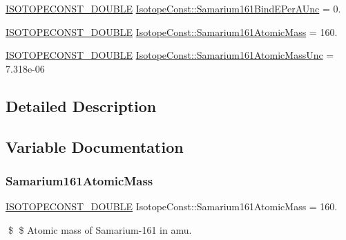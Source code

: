 \begin{DoxyCompactItemize}
\mbox{\hyperlink{group___isotope_const-_macros_ga8f45a7272ce02c0b4c65c44636ed719a}{I\+S\+O\+T\+O\+P\+E\+C\+O\+N\+S\+T\+\_\+\+D\+O\+U\+B\+LE}} \mbox{\hyperlink{group___isotope_const-_samarium-_sm161_gabdaadaf551b7c2b8d770944d9c60d25f}{Isotope\+Const\+::\+Samarium161\+Bind\+E\+Per\+A\+Unc}} = 0.
\item 
\mbox{\hyperlink{group___isotope_const-_macros_ga8f45a7272ce02c0b4c65c44636ed719a}{I\+S\+O\+T\+O\+P\+E\+C\+O\+N\+S\+T\+\_\+\+D\+O\+U\+B\+LE}} \mbox{\hyperlink{group___isotope_const-_samarium-_sm161_gac15db5c11676fe7e665ca0915d0745f2}{Isotope\+Const\+::\+Samarium161\+Atomic\+Mass}} = 160.
\item 
\mbox{\hyperlink{group___isotope_const-_macros_ga8f45a7272ce02c0b4c65c44636ed719a}{I\+S\+O\+T\+O\+P\+E\+C\+O\+N\+S\+T\+\_\+\+D\+O\+U\+B\+LE}} \mbox{\hyperlink{group___isotope_const-_samarium-_sm161_gac16d7dca961c8db0f5c45d1d999ae342}{Isotope\+Const\+::\+Samarium161\+Atomic\+Mass\+Unc}} = 7.\+318e-\/06
\end{DoxyCompactItemize}


\subsection{Detailed Description}


\subsection{Variable Documentation}
\mbox{\label{group___isotope_const-_samarium-_sm161_gac15db5c11676fe7e665ca0915d0745f2}} 
\subsubsection{\texorpdfstring{Samarium161\+Atomic\+Mass}{Samarium161AtomicMass}}
{\footnotesize\ttfamily \mbox{\hyperlink{group___isotope_const-_macros_ga8f45a7272ce02c0b4c65c44636ed719a}{I\+S\+O\+T\+O\+P\+E\+C\+O\+N\+S\+T\+\_\+\+D\+O\+U\+B\+LE}} Isotope\+Const\+::\+Samarium161\+Atomic\+Mass = 160.}

\$ \$ Atomic mass of Samarium-\/161 in amu. \mbox{\label{group___isotope_const-_samarium-_sm161_gac16d7dca961c8db0f5c45d1d999ae342}} 
